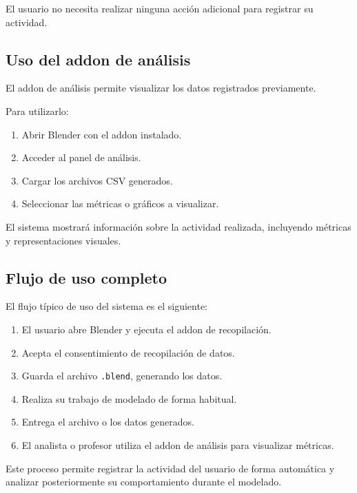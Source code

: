 El usuario no necesita realizar ninguna acción adicional para registrar su actividad.

\subsection{Uso del addon de análisis}

El addon de análisis permite visualizar los datos registrados previamente.

Para utilizarlo:

\begin{enumerate}
    \item Abrir Blender con el addon instalado.
    \item Acceder al panel de análisis.
    \item Cargar los archivos CSV generados.
    \item Seleccionar las métricas o gráficos a visualizar.
\end{enumerate}

El sistema mostrará información sobre la actividad realizada, incluyendo métricas y representaciones visuales.

\subsection{Flujo de uso completo}

El flujo típico de uso del sistema es el siguiente:

\begin{enumerate}
    \item El usuario abre Blender y ejecuta el addon de recopilación.
    \item Acepta el consentimiento de recopilación de datos.
    \item Guarda el archivo \texttt{.blend}, generando los datos.
    \item Realiza su trabajo de modelado de forma habitual.
    \item Entrega el archivo o los datos generados.
    \item El analista o profesor utiliza el addon de análisis para visualizar métricas.
\end{enumerate}

Este proceso permite registrar la actividad del usuario de forma automática y analizar posteriormente su comportamiento durante el modelado.